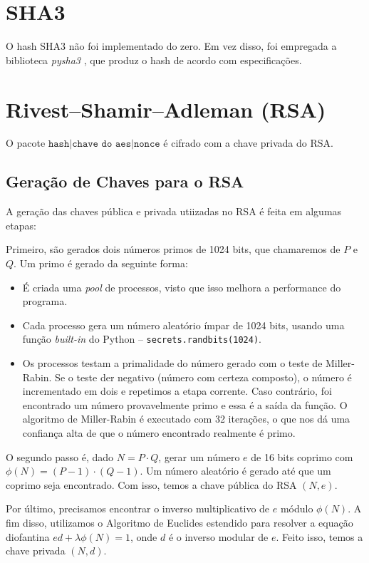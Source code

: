 \documentclass[a4paper, 10.5pt]{article}
\begin{document}

\section{SHA3} %
\label{sec:sha3}
O hash SHA3 não foi implementado do zero. Em vez disso, foi empregada a biblioteca
\textit{pysha3} \citep{pysha3}, que produz o hash de acordo com especificações.

\section{Rivest–Shamir–Adleman (RSA)} %
O pacote $\texttt{hash} | \texttt{chave do aes} | \texttt{nonce} $ é cifrado com
a chave privada do RSA.

\subsection{Geração de Chaves para o RSA} %
A geração das chaves pública e privada utiizadas no RSA é feita em algumas etapas:

Primeiro, são gerados dois números primos de 1024 bits, que chamaremos de $P$ e
$Q$. Um primo é gerado da seguinte forma:

\begin{itemize}
    \item É criada uma \textit{pool} de processos, visto que isso melhora a
        performance do programa.
    \item Cada processo gera um número aleatório ímpar de 1024 bits, usando uma função
        \textit{built-in} do Python -- \verb|secrets.randbits(1024)|.
    \item Os processos testam a primalidade do número gerado com o teste de
        Miller-Rabin. Se o teste der negativo (número com certeza composto), o
        número é incrementado em dois e repetimos a etapa corrente. Caso
        contrário, foi encontrado um número provavelmente primo e essa é a saída
        da função. O algoritmo de Miller-Rabin é executado com 32 iterações, o
        que nos dá uma confiança alta de que o número encontrado realmente é
        primo.
\end{itemize}

O segundo passo é, dado $N = P \cdot Q$, gerar um número $e$ de 16 bits
coprimo com $ \phi(N) = (P-1) \cdot (Q-1) $. Um número aleatório é gerado até que um coprimo seja
encontrado. Com isso, temos a chave pública do RSA $(N, e)$.  

Por último, precisamos encontrar o inverso multiplicativo de $e$ módulo
$\phi(N)$. A fim disso, utilizamos o Algoritmo de Euclides estendido para
resolver a equação diofantina $ed + \lambda \phi(N) = 1$, onde $d$ é o
inverso modular de $e$. Feito isso, temos a chave privada $(N, d)$.
\end{document}
